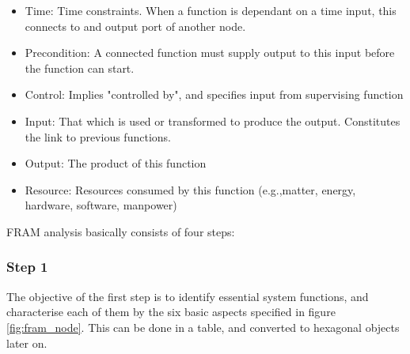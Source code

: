 \begin{itemize}
  \item Time: Time constraints. When a function is dependant on a time input, this connects to and output port of another node.

  \item Precondition: A connected function must supply output to this input before the function can start.

  \item Control: Implies "controlled by", and specifies input from supervising function
  
  \item Input: That which is used or transformed to produce the output. Constitutes the link to previous functions.

  \item Output: The product of this function
  \item Resource: Resources consumed by this function (e.g.,matter, energy, hardware, software, manpower)
\end{itemize} 


FRAM analysis basically consists of four steps:

\subsubsection*{Step 1}
The objective of the first step is to identify essential system functions, and characterise each of them by the six basic aspects specified in figure \ref{fig:fram_node}. This can be done in a table, and converted to hexagonal objects later on.
